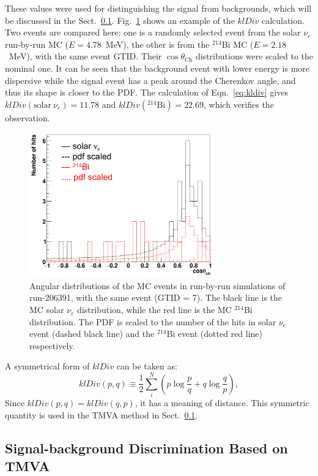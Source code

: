 These values were used for distinguishing the signal from backgrounds, which will be discussed in the Sect.~\ref{sect:tmva}. Fig.~\ref{kLdiv_example} shows an example of the $klDiv$ calculation. Two events are compared here: one is a randomly selected event from the solar $\nu_e$ run-by-run MC ($E=4.78$~MeV), the other is from the $^{214}$Bi MC ($E=2.18$~MeV), with the same event GTID. Their $\cos\theta_\mathrm{Ch}$ distributions were scaled to the nominal one. It can be seen that the background event with lower energy is more dispersive while the signal event has a peak around the Cherenkov angle, and thus its shape is closer to the PDF. The calculation of Eqn.~\ref{eq:kldiv} gives $klDiv(\mathrm{solar}~\nu_e)=11.78$ and $klDiv(^{214}\mathrm{Bi})=22.69$, which verifies the observation.

\begin{figure}[!htb]
	\centering
	\includegraphics[width=8cm]{klDiv_example.png}
	\caption[Angular distributions of the MC events in run-by-run simulations.]{Angular distributions of the MC events in run-by-run simulations of run-206391, with the same event (GTID = 7). The black line is the MC solar $\nu_e$ distribution, while the red line is the MC $^{214}$Bi distribution. The PDF is scaled to the number of the hits in solar $\nu_e$ event (dashed black line) and the $^{214}$Bi event (dotted red line) respectively. \label{kLdiv_example}}
\end{figure}

A symmetrical form of $klDiv$ can be taken as:
\begin{equation}\label{eq:symKlDiv}
klDiv(p,q) \equiv \frac{1}{2}\sum_{i}^N (p\log{\frac{p}{q}}+q\log{\frac{q}{p}}),
\end{equation}
Since $klDiv(p,q)=klDiv(q,p)$, it has a meaning of distance. This symmetric quantity is used in the TMVA method in Sect.~\ref{sect:tmva}.

\subsection{Signal-background Discrimination Based on TMVA}\label{sect:tmva}

